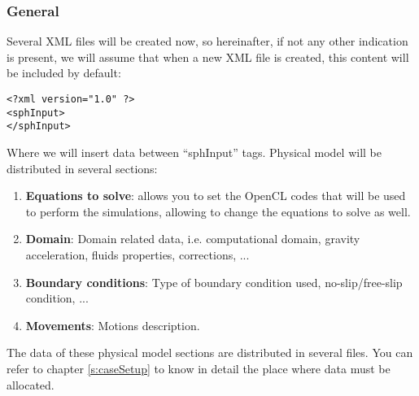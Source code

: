 \subsubsection{General}
%
Several XML files will be created now, so hereinafter, if not any other indication is present, we will assume that
when a new XML file is created, this content will be included by default:
%
\begin{verbatim}
<?xml version="1.0" ?>
<sphInput>
</sphInput>
\end{verbatim}
%
Where we will insert data between ``sphInput'' tags.\rc
%
Physical model will be distributed in several sections:
%
\begin{enumerate}
	\item \textbf{Equations to solve}: \NAME allows you to set the OpenCL codes that will be used to perform
	the simulations, allowing to change the equations to solve as well.
	\item \textbf{Domain}: Domain related data, i.e. computational domain, gravity acceleration, fluids
	properties, corrections, ...
	\item \textbf{Boundary conditions}: Type of boundary condition used, no-slip/free-slip condition, ...
	\item \textbf{Movements}: Motions description.
\end{enumerate}
%
The data of these physical model sections are distributed in several files. You can refer to chapter
\ref{s:caseSetup} to know in detail the place where data must be allocated.\rc
%
